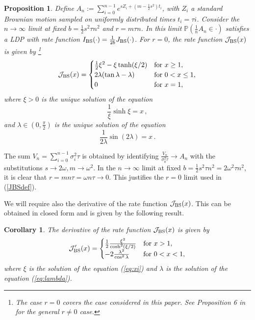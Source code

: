 \documentclass[11pt]{article}
\numberwithin{equation}{section}
\theoremstyle{plain}
\newtheorem{corollary}[theorem]{Corollary}
\newtheorem{proposition}[theorem]{Proposition}
\begin{document}
\begin{proposition}\label{prop:JBS}
Define $A_n := \sum_{i=0}^{n-1} e^{sZ_i + (m-\frac12 s^2) t_i}$, with $Z_i$ a 
standard
Brownian motion sampled on uniformly distributed times $t_i = \tau i$. 
Consider the $n\to \infty$
limit at fixed $b=\frac12 s^2 \tau n^2$ and $r = m\tau n$. In this limit 
$\mathbb{P}(\frac{1}{n} A_n \in \cdot) $ satisfies a LDP with rate function 
$I_{\rm BS} (\cdot ) = \frac{1}{2b} J_{\rm BS}(\cdot)$.
For $r=0$, 
the rate function $\mathcal{J}_{\rm BS}(x)$ is given by
\footnote{The case $r=0$ covers the case considered in this paper. See Proposition 6
in \cite{PZDiscreteAsian} for the general $r\neq 0$ case.}
\begin{equation}\label{JBSdef}
\mathcal{J}_{\rm BS}(x) = 
\begin{cases}
\frac12\xi^2 - \xi \tanh(\xi/2) &
\text{for $x \geq 1$}, \\
2\lambda(\tan \lambda - \lambda) &
\text{for $0 <x \leq 1$}, \\
0 & \text{for $x=1$},
\end{cases}
\end{equation}
where $\xi>0$ is the unique solution of the equation
\begin{equation}\label{eq:xi}
\frac{1}{\xi} \sinh\xi = x\,,
\end{equation}
and $\lambda\in (0,\frac{\pi}{2})$ is the unique solution of the equation
\begin{equation}\label{eq:lambda}
\frac{1}{2\lambda} \sin(2\lambda) = x\,.
\end{equation}
\end{proposition}

The sum $V_n= \sum_{i=0}^{n-1} \sigma_i^2 \tau$ is obtained by identifying 
$\frac{V_n}{\sigma_0^2\tau}
\to A_n$ with the substitutions $s \to 2\omega, m \to \omega^2$. In the $n\to \infty$ limit at fixed
$b = \frac12s^2 \tau n^2 = 2 \omega^2 \tau n^2$, it is clear that $r = m n\tau = \omega n \tau \to 0$. 
This justifies the $r=0$ limit used in (\ref{JBSdef}).

We will require also the derivative of the rate function 
$\mathcal{J}_{\rm BS}(x)$.
This can be obtained in closed form and is given by the following result.

\begin{corollary}
The derivative of the rate function $\mathcal{J}_{\rm BS}(x)$ is given by
\begin{equation}
\mathcal{J}'_{\rm BS}(x) = 
\begin{cases}
\frac12 \frac{\xi^2}{\cosh^2(\xi/2)} & \text{for $x > 1$}, \\
- 2 \frac{\lambda^2}{\cos^2\lambda} & \text{for $0 < x < 1$},
\end{cases}
\end{equation}
where $\xi$ is the solution of the equation (\ref{eq:xi}) and $\lambda$ is the solution of the
equation (\ref{eq:lambda}).
\end{corollary}
\end{document}
